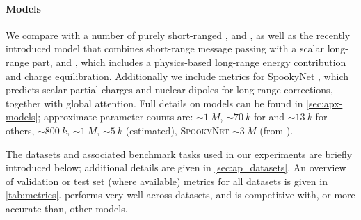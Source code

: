 \documentclass[10pt]{article}
\begin{document}
\paragraph{Models}
We compare \lorem with a number of purely short-ranged \mlps, \mace and \pet, as well as the recently introduced \cace model that combines short-range message passing with a scalar long-range part, and \fgnn, which includes a physics-based long-range energy contribution and charge equilibration. Additionally we include metrics for SpookyNet \citep{ucgssm2021}, which predicts scalar partial charges and nuclear dipoles for long-range corrections, together with global attention. Full details on models can be found in \cref{sec:apx-models}; approximate parameter counts are: \lorem ${\sim}\qty{1}{M}$, \cace  ${\sim}\qty{70}{k}$ for  and ${\sim}\qty{13}{k}$ for others, \mace  ${\sim}\qty{800}{k}$, \pet ${\sim}\qty{1}{M}$, \fgnn ${\sim}\qty{5}{k}$ (estimated), \textsc{SpookyNet} ${\sim}\qty{3}{M}$ (from \citep{bmc2023}).

\begin{table}
    \caption{Root mean squared errors (RMSE) for energy $E$ and forces $\F$ for datasets and models used in \cref{sub:default}. Where available, a held-out test set was used; otherwise, the validation set was used instead and indicated in the table. The lowest error is indicated in bold, the second lowest is underlined. The second line after each model name indicates the number of short-range (SR) message-passing steps and whether some form of long-range (LR) interactions are included in the model.
    A mean absolute error (MAE) version of this table is provided in \cref{sec:apx-mae-rmse}.}
    \centering
    
    \label{tab:metrics}
\end{table}

The datasets and associated benchmark tasks used in our experiments are briefly introduced below; additional details are given in \cref{sec:ap_datasets}. An overview of validation or test set (where available) metrics for all datasets is given in \cref{tab:metrics}. \lorem performs very well across datasets, and is competitive with, or more accurate than, other models.
\end{document}
